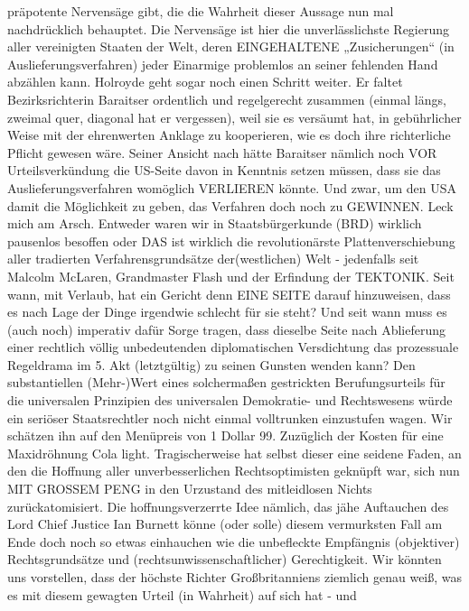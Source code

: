 \begin{multicols}{2}
{präpotente Nervensäge gibt, die die Wahrheit dieser Aussage nun mal
nachdrücklich behauptet. Die Nervensäge ist hier die unverlässlichste Regierung
aller vereinigten Staaten der Welt, deren EINGEHALTENE
„Zusicherungen“ (in Auslieferungsverfahren) jeder Einarmige problemlos an seiner
 fehlenden Hand abzählen kann.\textCR
Holroyde geht sogar noch einen Schritt weiter. Er faltet Bezirksrichterin
Baraitser ordentlich und regelgerecht zusammen (einmal längs, zweimal quer,
diagonal hat er vergessen), weil sie es versäumt hat, in gebührlicher Weise mit
der ehrenwerten Anklage zu kooperieren, wie es doch ihre richterliche Pflicht
gewesen wäre. Seiner Ansicht nach hätte Baraitser nämlich noch VOR
Urteilsverkündung die US-Seite davon in Kenntnis setzen müssen, dass sie das
Auslieferungsverfahren womöglich VERLIEREN könnte. Und zwar, um den USA damit
die Möglichkeit zu geben, das Verfahren doch noch zu GEWINNEN.\textCR
Leck mich am Arsch. Entweder waren wir in Staatsbürgerkunde (BRD) wirklich
pausenlos besoffen oder DAS ist wirklich die revolutionärste
Plattenverschiebung aller tradierten Verfahrensgrundsätze der(westlichen) Welt
- jedenfalls seit Malcolm McLaren, Grandmaster Flash und der Erfindung der
  TEKTONIK.\textCR
Seit wann, mit Verlaub, hat ein Gericht denn EINE SEITE darauf hinzuweisen, dass
es nach Lage der Dinge irgendwie schlecht für sie steht? Und seit wann muss es
(auch noch) imperativ dafür Sorge tragen, dass dieselbe Seite nach Ablieferung
einer rechtlich völlig unbedeutenden diplomatischen Versdichtung das
prozessuale Regeldrama im 5. Akt (letztgültig) zu seinen Gunsten wenden kann?\textCR
Den substantiellen (Mehr-)Wert eines solchermaßen gestrickten Berufungsurteils
für die universalen Prinzipien des universalen Demokratie- und Rechtswesens
würde ein seriöser Staatsrechtler noch nicht einmal volltrunken einzustufen
wagen. Wir schätzen ihn auf den Menüpreis von 1 Dollar 99. Zuzüglich der Kosten
für eine Maxidröhnung Cola light.\textCR
Tragischerweise hat selbst dieser eine seidene Faden, an den die Hoffnung aller
unverbesserlichen Rechtsoptimisten geknüpft war, sich nun MIT GROSSEM PENG in
den Urzustand des mitleidlosen Nichts zurückatomisiert. Die hoffnungsverzerrte
Idee nämlich, das jähe Auftauchen des Lord Chief Justice Ian Burnett könne
(oder solle) diesem vermurksten Fall am Ende doch noch so etwas einhauchen wie
die unbefleckte Empfängnis (objektiver) Rechtsgrundsätze und
(rechtsunwissenschaftlicher) Gerechtigkeit.\textCR
Wir könnten uns vorstellen, dass der höchste Richter Großbritanniens ziemlich
genau weiß, was es mit diesem gewagten Urteil (in Wahrheit) auf sich hat - und
}
\end{multicols}
